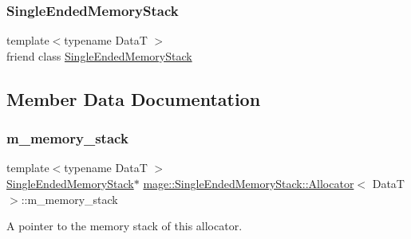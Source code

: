 \subsubsection{\texorpdfstring{Single\+Ended\+Memory\+Stack}{SingleEndedMemoryStack}}
{\footnotesize\ttfamily template$<$typename DataT $>$ \\
friend class \hyperlink{classmage_1_1_single_ended_memory_stack}{Single\+Ended\+Memory\+Stack}\hspace{0.3cm}{\ttfamily [friend]}}



\subsection{Member Data Documentation}
\hypertarget{classmage_1_1_single_ended_memory_stack_1_1_allocator_ac5d79f87385234430d25cdf004255d70}{}\label{classmage_1_1_single_ended_memory_stack_1_1_allocator_ac5d79f87385234430d25cdf004255d70} 
\subsubsection{\texorpdfstring{m\+\_\+memory\+\_\+stack}{m\_memory\_stack}}
{\footnotesize\ttfamily template$<$typename DataT $>$ \\
\hyperlink{classmage_1_1_single_ended_memory_stack}{Single\+Ended\+Memory\+Stack}$\ast$ \hyperlink{classmage_1_1_single_ended_memory_stack_1_1_allocator}{mage\+::\+Single\+Ended\+Memory\+Stack\+::\+Allocator}$<$ DataT $>$\+::m\+\_\+memory\+\_\+stack\hspace{0.3cm}{\ttfamily [private]}}

A pointer to the memory stack of this allocator. 